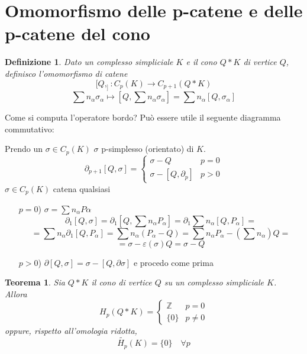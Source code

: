 \documentclass[a4paper]{report}
\newtheorem{theorem}{Teorema}
\newtheorem{definition}{Definizione}
\newcommand{\Z}{\ensuremath{\mathbb{Z}}}
\newcommand{\ra}{\ensuremath{\rightarrow}}
\begin{document}
\section{Omomorfismo delle p-catene e delle p-catene del cono}
\begin{definition}
    Dato un complesso simpliciale $K$ e il cono $Q*K$ di vertice $Q$, definisco l'omomorfismo di catene
    \[
        [Q,_]:C_p(K)\ra C_{p+1}(Q*K)    
    \]
    \[
        \sum n_\alpha\sigma_\alpha\mapsto [Q,\sum n_\alpha\sigma_\alpha]=\sum n_\alpha[Q,\sigma_\alpha]    
    \]
\end{definition}
Come si computa l'operatore bordo? Può essere utile il seguente diagramma commutativo:
\begin{center}
\end{center}
Prendo un $\sigma\in C_p(K)$ $\sigma$ p-simplesso (orientato) di $K$.
\[
        \partial_{p+1}[Q,\sigma]=\begin{cases}
            \sigma- Q & p=0\\
            \sigma-[Q,\partial_p] & p>0
        \end{cases}
\]
$\sigma\in C_p(K)$ catena qualsiasi
\begin{itemize}
    \item [$p=0$)] $\sigma=\sum n_\alpha P\alpha$
    \[
        \partial_1[Q,\sigma]=\partial_1[Q,\sum n_\alpha P_\alpha]=\partial_1\sum n_\alpha[Q,P_\alpha]=
    \]\[
        =\sum n_\alpha\partial_1[Q,P_\alpha]=\sum n_\alpha(P_\alpha-Q)=\sum n_\alpha P_\alpha-(\sum n_\alpha)Q=
    \]\[
        =\sigma-\varepsilon(\sigma)Q=\sigma-Q
    \]
    \item [$p>0$)] $\partial[Q,\sigma]=\sigma-[Q,\partial\sigma]$ e procedo come prima
\end{itemize}
\begin{theorem}
    Sia $Q*K$ il cono di vertice $Q$ su un complesso simpliciale $K$.\\
    Allora
    \[
        H_p(Q*K)=\begin{cases}
            \Z & p=0\\
            \{0\} & p\neq 0
        \end{cases}
    \]
    oppure, rispetto all'omologia ridotta,
    \[
        \tilde{H_p}(K)=\{0\}\quad \forall p
    \]
\end{theorem}
\end{document}
